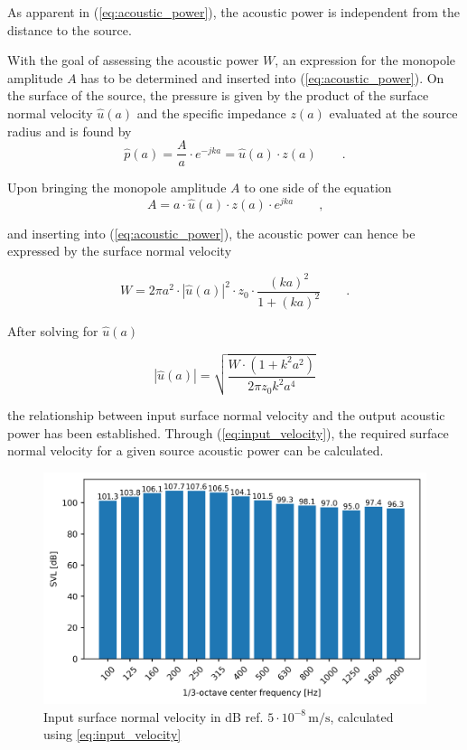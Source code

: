 As apparent in (\ref{eq:acoustic_power}), the acoustic power is independent from the distance to the source.

With the goal of assessing the acoustic power $W$, an expression for the monopole amplitude $A$ has to be determined and inserted into (\ref{eq:acoustic_power}). On the surface of the source, the pressure is given by the product of the surface normal velocity $\hat{u}(a)$ and the specific impedance $z(a)$ evaluated at the source radius and is found by
\begin{equation}
	\hat{p}(a) = \frac{A}{a}\cdot e^{-jka} = \hat{u}(a)\cdot z(a) \qquad \text{.}
\end{equation}

Upon bringing the monopole amplitude $A$ to one side of the equation
\begin{equation}
	A = a\cdot\hat{u}(a)\cdot z(a)\cdot e^{jka}\qquad\text{,}
\end{equation}

and inserting into (\ref{eq:acoustic_power}), the acoustic power can hence be expressed by the surface normal velocity

\begin{equation}
	W = 2\pi a^2\cdot|\hat{u}(a)|^2\cdot z_0 \cdot \frac{(ka)^2}{1+(ka)^2} \qquad\text{.}
\end{equation}

After solving for $\hat{u}(a)$

\begin{equation}
	|\hat{u}(a)| = \sqrt{\frac{W\cdot(1 + k^2a^2)}{2\pi z_0 k^2a^4}} \label{eq:input_velocity}
\end{equation}

the relationship between input surface normal velocity and the output acoustic power has been established. Through (\ref{eq:input_velocity}), the required surface normal velocity for a given source acoustic power can be calculated.

\begin{figure}[H]
	\centering
	\includegraphics{fig/chap4/input_SVL.png}
	\caption{Input surface normal velocity in dB ref. $5\cdot10^{-8}\,\text{m/s}$, calculated using \ref{eq:input_velocity}}
\end{figure}




